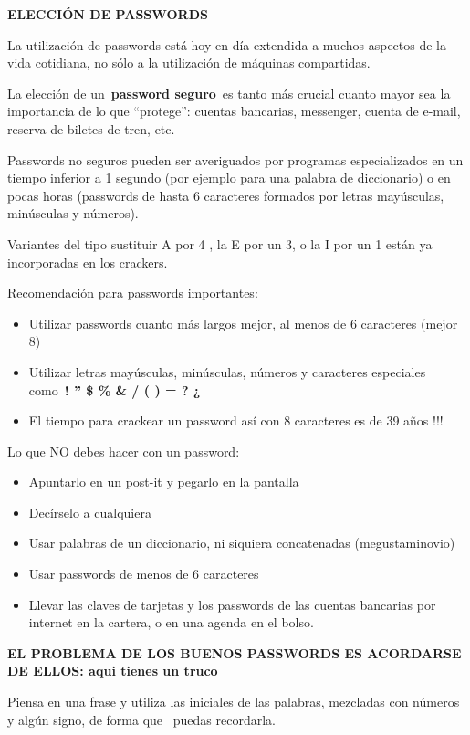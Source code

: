 \documentclass[
  jou,
  floatsintext,
  longtable,
  a4paper,
  nolmodern,
  notxfonts,
  notimes,
  12pt,
  colorlinks=true,linkcolor=blue,citecolor=blue,urlcolor=blue]{apa7}
\providecommand{\tightlist}{%
  \setlength{\itemsep}{0pt}\setlength{\parskip}{0pt}}
\begin{document}
\textbf{ELECCIÓN DE PASSWORDS}

La utilización de passwords está hoy en día extendida a muchos aspectos
de la vida cotidiana, no sólo a la utilización de máquinas compartidas.

La elección de un~\textbf{password seguro}~es tanto más crucial cuanto
mayor sea la importancia de lo que ``protege'': cuentas bancarias,
messenger, cuenta de e-mail, reserva de biletes de tren, etc.

Passwords no seguros pueden ser averiguados por programas especializados
en un tiempo inferior a 1 segundo (por ejemplo para una palabra de
diccionario) o en pocas horas (passwords de hasta 6 caracteres formados
por letras mayúsculas, minúsculas y números).

Variantes del tipo sustituir A por 4 , la E por un 3, o la I por un 1
están ya incorporadas en los crackers.

Recomendación para passwords importantes:

\begin{itemize}
\tightlist
\item
  Utilizar passwords cuanto más largos mejor, al menos de 6 caracteres
  (mejor 8)
\item
  Utilizar letras mayúsculas, minúsculas, números y caracteres
  especiales~ como~\textbf{! '' \$ \% \& / ( ) = ? ¿}
\item
  El tiempo para crackear un password así con 8 caracteres es de 39 años
  !!!
\end{itemize}

Lo que NO debes hacer con un password:

\begin{itemize}
\tightlist
\item
  Apuntarlo en un post-it y pegarlo en la pantalla
\item
  Decírselo a cualquiera
\item
  Usar palabras de un diccionario, ni siquiera concatenadas
  (megustaminovio)
\item
  Usar passwords de menos de 6 caracteres
\item
  Llevar las claves de tarjetas y los passwords de las cuentas bancarias
  por internet en la cartera, o en una agenda en el bolso.
\end{itemize}

\textbf{EL PROBLEMA DE LOS BUENOS PASSWORDS ES ACORDARSE DE ELLOS: aqui
tienes un truco}

Piensa en una frase y utiliza las iniciales de las palabras, mezcladas
con números y algún signo, de forma que~ puedas recordarla.
\end{document}

